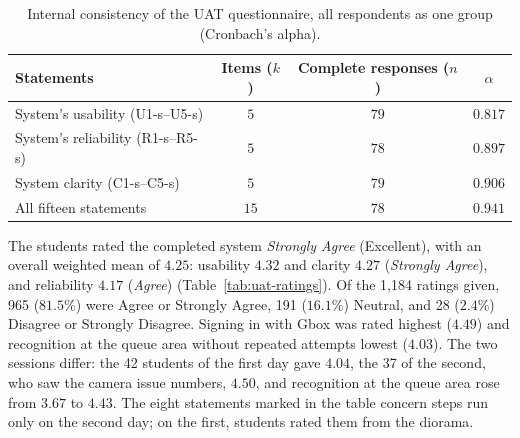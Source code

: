 \documentclass{research}
\begin{document}
\begin{table}[H]
\centering
\caption{Internal consistency of the UAT questionnaire, all respondents
as one group (Cronbach's alpha).}
\label{tab:uat-reliability}
\begin{tabular}{lccc}
\hline
Statements & Items ($k$) & Complete responses ($n$) & $\alpha$ \\
\hline
System's usability (U1-s--U5-s) & $5$ & $79$ & $0.817$ \\
System's reliability (R1-s--R5-s) & $5$ & $78$ & $0.897$ \\
System clarity (C1-s--C5-s) & $5$ & $79$ & $0.906$ \\
All fifteen statements & $15$ & $78$ & $0.941$ \\
\hline
\end{tabular}
\end{table}

\label{subsec:uat-ratings}

The students rated the completed system \emph{Strongly Agree}
(Excellent), with an overall weighted mean of $4.25$: usability $4.32$
and clarity $4.27$ (\emph{Strongly Agree}), and reliability $4.17$
(\emph{Agree}) (Table~\ref{tab:uat-ratings}). Of the 1,184 ratings given,
965 ($81.5\%$) were Agree or Strongly Agree, 191 ($16.1\%$) Neutral, and
28 ($2.4\%$) Disagree or Strongly Disagree. Signing in with Gbox was
rated highest ($4.49$) and recognition at the queue area without repeated
attempts lowest ($4.03$). The two sessions differ: the 42 students of the
first day gave $4.04$, the 37 of the second, who saw the camera issue
numbers, $4.50$, and recognition at the queue area rose from $3.67$ to
$4.43$. The eight statements marked in the table concern steps run only
on the second day; on the first, students rated them from the diorama.
\end{document}
